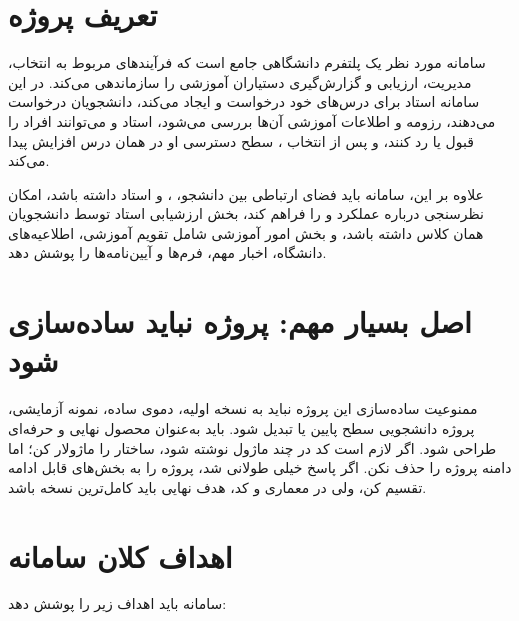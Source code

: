 \documentclass[12pt,a4paper]{article}
\begin{document}
\section{تعریف پروژه}
سامانه مورد نظر یک پلتفرم دانشگاهی جامع است که فرآیندهای مربوط به انتخاب، مدیریت، ارزیابی و گزارش‌گیری دستیاران آموزشی را سازماندهی می‌کند. در این سامانه استاد برای درس‌های خود درخواست  و  ایجاد می‌کند، دانشجویان درخواست می‌دهند، رزومه و اطلاعات آموزشی آن‌ها بررسی می‌شود، استاد و  می‌توانند افراد را قبول یا رد کنند، و پس از انتخاب ، سطح دسترسی او در همان درس افزایش پیدا می‌کند.

علاوه بر این، سامانه باید فضای ارتباطی بین دانشجو، ،  و استاد داشته باشد، امکان نظرسنجی درباره عملکرد  و  را فراهم کند، بخش ارزشیابی استاد توسط دانشجویان همان کلاس داشته باشد، و بخش امور آموزشی شامل تقویم آموزشی، اطلاعیه‌های دانشگاه، اخبار مهم، فرم‌ها و آیین‌نامه‌ها را پوشش دهد.

\section{اصل بسیار مهم: پروژه نباید ساده‌سازی شود}
\begin{rulebox}{ممنوعیت ساده‌سازی}
این پروژه نباید به نسخه اولیه، دموی ساده، نمونه آزمایشی، پروژه دانشجویی سطح پایین یا  تبدیل شود. باید به‌عنوان محصول نهایی و حرفه‌ای طراحی شود. اگر لازم است کد در چند ماژول نوشته شود، ساختار را ماژولار کن؛ اما دامنه پروژه را حذف نکن. اگر پاسخ خیلی طولانی شد، پروژه را به بخش‌های قابل ادامه تقسیم کن، ولی در معماری و کد، هدف نهایی باید کامل‌ترین نسخه باشد.
\end{rulebox}

\section{اهداف کلان سامانه}
سامانه باید اهداف زیر را پوشش دهد:
\end{document}
